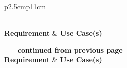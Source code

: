 \documentclass[12pt]{article}
\begin{document}
\begin{longtable}{p{2.5cm}p{11cm}}
    \caption{Traceability from Requirements to Use Cases}\label{tab:req_uc}\\
    \toprule
    \textbf{Requirement} & \textbf{Use Case(s)} \\
    \midrule
    \endfirsthead
    
    {{\bfseries \tablename\ \thetable{} -- continued from previous page}} \\
    \toprule
    \textbf{Requirement} & \textbf{Use Case(s)} \\
    \midrule
    \endhead
    
    \midrule
     \\
    \endfoot
    
    \bottomrule
    \endlastfoot


\end{longtable}
\end{document}
